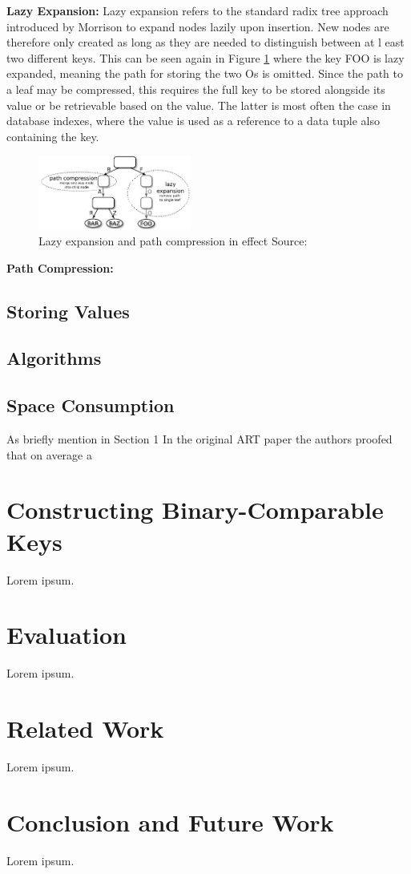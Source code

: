 \documentclass[acmtog, nonacm]{acmart}
\begin{document}
\textbf{Lazy Expansion:} 
Lazy expansion refers to the standard radix tree approach introduced by Morrison \cite{10.1145/321479.321481} to 
expand nodes lazily upon insertion. New nodes are therefore only created as long as they are needed to distinguish between at l
east two different keys. This can be seen
again in Figure \ref{fig:art-vertical-compression} where the key FOO is lazy expanded, meaning the path for storing the
two Os is omitted. Since the path to a leaf may be compressed, this requires the full key to be stored alongside 
its value or be retrievable based on the value. The latter is most often the case in database indexes, where the value 
is used as a reference to a data tuple also containing the key.

\begin{figure}
    \centering
    \includegraphics[width=0.45\textwidth]{images/04-art-vertical-compression.PNG}
    \caption{Lazy expansion and path compression in effect
    Source: \cite{6544812}}
    \label{fig:art-vertical-compression}
\end{figure}

\textbf{Path Compression:}

\subsection{Storing Values}

\subsection{Algorithms}

\subsection{Space Consumption}
As briefly mention in Section 1
In the original ART paper \cite{6544812} the authors proofed that on average a

\section{Constructing Binary-Comparable Keys}
Lorem ipsum.

\section{Evaluation}
Lorem ipsum.

\section{Related Work}
Lorem ipsum.

\section{Conclusion and Future Work}
Lorem ipsum.



\end{document}
